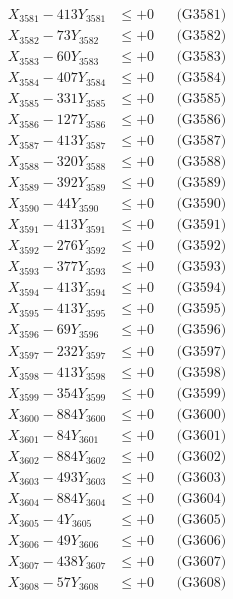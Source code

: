 \documentclass[a4paper,10pt]{article}
\begin{document}
{\begin{align}
\allowbreak
X_{3581} - 413Y_{3581} &\leq +0 && \text{(G3581)} \\
X_{3582} - 73Y_{3582} &\leq +0 && \text{(G3582)} \\
X_{3583} - 60Y_{3583} &\leq +0 && \text{(G3583)} \\
X_{3584} - 407Y_{3584} &\leq +0 && \text{(G3584)} \\
X_{3585} - 331Y_{3585} &\leq +0 && \text{(G3585)} \\
X_{3586} - 127Y_{3586} &\leq +0 && \text{(G3586)} \\
X_{3587} - 413Y_{3587} &\leq +0 && \text{(G3587)} \\
X_{3588} - 320Y_{3588} &\leq +0 && \text{(G3588)} \\
X_{3589} - 392Y_{3589} &\leq +0 && \text{(G3589)} \\
X_{3590} - 44Y_{3590} &\leq +0 && \text{(G3590)} \\
\allowbreak
X_{3591} - 413Y_{3591} &\leq +0 && \text{(G3591)} \\
X_{3592} - 276Y_{3592} &\leq +0 && \text{(G3592)} \\
X_{3593} - 377Y_{3593} &\leq +0 && \text{(G3593)} \\
X_{3594} - 413Y_{3594} &\leq +0 && \text{(G3594)} \\
X_{3595} - 413Y_{3595} &\leq +0 && \text{(G3595)} \\
X_{3596} - 69Y_{3596} &\leq +0 && \text{(G3596)} \\
X_{3597} - 232Y_{3597} &\leq +0 && \text{(G3597)} \\
X_{3598} - 413Y_{3598} &\leq +0 && \text{(G3598)} \\
X_{3599} - 354Y_{3599} &\leq +0 && \text{(G3599)} \\
X_{3600} - 884Y_{3600} &\leq +0 && \text{(G3600)} \\
\allowbreak
X_{3601} - 84Y_{3601} &\leq +0 && \text{(G3601)} \\
X_{3602} - 884Y_{3602} &\leq +0 && \text{(G3602)} \\
X_{3603} - 493Y_{3603} &\leq +0 && \text{(G3603)} \\
X_{3604} - 884Y_{3604} &\leq +0 && \text{(G3604)} \\
X_{3605} - 4Y_{3605} &\leq +0 && \text{(G3605)} \\
X_{3606} - 49Y_{3606} &\leq +0 && \text{(G3606)} \\
X_{3607} - 438Y_{3607} &\leq +0 && \text{(G3607)} \\
X_{3608} - 57Y_{3608} &\leq +0 && \text{(G3608)} \\

\end{align}}
\end{document}
